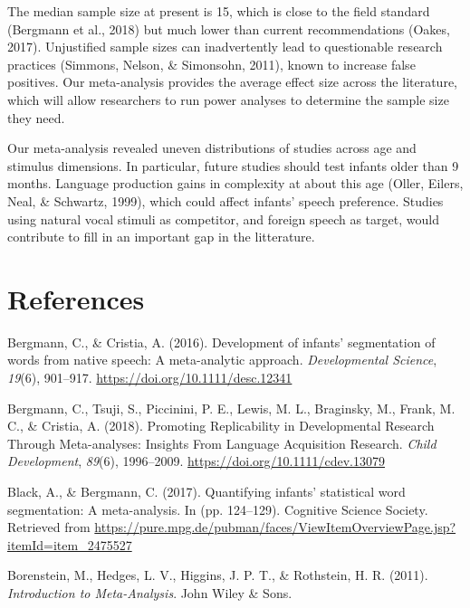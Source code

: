 \documentclass[man]{apa6}
\begin{document}
The median sample size at present is 15, which is close to the field standard (Bergmann et al., 2018) but much lower than current recommendations (Oakes, 2017). Unjustified sample sizes can inadvertently lead to questionable research practices (Simmons, Nelson, \& Simonsohn, 2011), known to increase false positives. Our meta-analysis provides the average effect size across the literature, which will allow researchers to run power analyses to determine the sample size they need.

Our meta-analysis revealed uneven distributions of studies across age and stimulus dimensions. In particular, future studies should test infants older than 9 months. Language production gains in complexity at about this age (Oller, Eilers, Neal, \& Schwartz, 1999), which could affect infants' speech preference. Studies using natural vocal stimuli as competitor, and foreign speech as target, would contribute to fill in an important gap in the litterature.

\newpage

\hypertarget{references}{%
\section{References}\label{references}}

\begingroup
\setlength{\parindent}{-0.5in}
\setlength{\leftskip}{0.5in}

\hypertarget{refs}{}
\leavevmode\hypertarget{ref-bergmann_development_2016}{}%
Bergmann, C., \& Cristia, A. (2016). Development of infants' segmentation of words from native speech: A meta-analytic approach. \emph{Developmental Science}, \emph{19}(6), 901--917. \url{https://doi.org/10.1111/desc.12341}

\leavevmode\hypertarget{ref-bergmann_promoting_2018}{}%
Bergmann, C., Tsuji, S., Piccinini, P. E., Lewis, M. L., Braginsky, M., Frank, M. C., \& Cristia, A. (2018). Promoting Replicability in Developmental Research Through Meta-analyses: Insights From Language Acquisition Research. \emph{Child Development}, \emph{89}(6), 1996--2009. \url{https://doi.org/10.1111/cdev.13079}

\leavevmode\hypertarget{ref-black_quantifying_2017}{}%
Black, A., \& Bergmann, C. (2017). Quantifying infants' statistical word segmentation: A meta-analysis. In (pp. 124--129). Cognitive Science Society. Retrieved from \url{https://pure.mpg.de/pubman/faces/ViewItemOverviewPage.jsp?itemId=item_2475527}

\leavevmode\hypertarget{ref-borenstein_introduction_2011}{}%
Borenstein, M., Hedges, L. V., Higgins, J. P. T., \& Rothstein, H. R. (2011). \emph{Introduction to Meta-Analysis}. John Wiley \& Sons.
\end{document}
